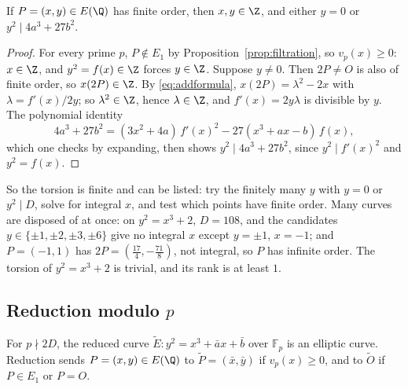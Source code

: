 \begin{theorem}\label{thm:nagelllutz}
If $P=(x,y)\in E(\Q)$ has finite order, then $x,y\in\Z$, and either $y=0$ or $y^2\mid4a^3+27b^2$.
\end{theorem}
\begin{proof}
For every prime $p$, $P\notin E_1$ by Proposition~\ref{prop:filtration}, so $v_p(x)\ge0$: $x\in\Z$, and $y^2=f(x)\in\Z$ forces $y\in\Z$. Suppose $y\ne0$. Then
$2P\ne O$ is also of finite order, so $x(2P)\in\Z$. By \eqref{eq:addformula}, $x(2P)=\lambda^2-2x$ with $\lambda=f'(x)/2y$; so $\lambda^2\in\Z$, hence
$\lambda\in\Z$, and $f'(x)=2y\lambda$ is divisible by $y$. The polynomial identity
\[
4a^3+27b^2=(3x^2+4a)\,f'(x)^2-27(x^3+ax-b)\,f(x),
\]
which one checks by expanding, then shows $y^2\mid4a^3+27b^2$, since $y^2\mid f'(x)^2$ and $y^2=f(x)$.
\end{proof}

So the torsion is finite and can be listed: try the finitely many $y$ with $y=0$ or $y^2\mid D$, solve for integral $x$, and test which points have finite
order. Many curves are disposed of at once: on $y^2=x^3+2$, $D=108$, and the candidates $y\in\{\pm1,\pm2,\pm3,\pm6\}$ give no integral $x$ except
$y=\pm1$, $x=-1$; and $P=(-1,1)$ has $2P=(\frac{17}4,-\frac{71}8)$, not integral, so $P$ has infinite order. The torsion of $y^2=x^3+2$ is trivial, and its rank is
at least $1$.

\subsection*{Reduction modulo $p$}

For $p\nmid2D$, the reduced curve $\tilde E:y^2=x^3+\bar ax+\bar b$ over $\mathbb F_p$ is an elliptic curve. Reduction sends $P=(x,y)\in E(\Q)$ to
$\tilde P=(\bar x,\bar y)$ if $v_p(x)\ge0$, and to $\tilde O$ if $P\in E_1$ or $P=O$.

